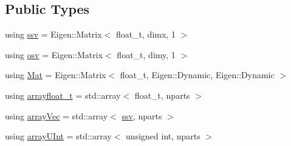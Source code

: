 \subsection*{Public Types}
\begin{DoxyCompactItemize}
\item 
using \hyperlink{classAPF_a5f96da87f00ff75af1232f9021daf06a}{ssv} = Eigen\+::\+Matrix$<$ float\+\_\+t, dimx, 1 $>$
\item 
using \hyperlink{classAPF_aa8ac25c475e54ddf21999f28727a049e}{osv} = Eigen\+::\+Matrix$<$ float\+\_\+t, dimy, 1 $>$
\item 
using \hyperlink{classAPF_a448066ff44c8afb24c89bcea11d604c6}{Mat} = Eigen\+::\+Matrix$<$ float\+\_\+t, Eigen\+::\+Dynamic, Eigen\+::\+Dynamic $>$
\item 
using \hyperlink{classAPF_ac686d94dd5c9f06febed3508dad43520}{arrayfloat\+\_\+t} = std\+::array$<$ float\+\_\+t, nparts $>$
\item 
using \hyperlink{classAPF_af0e0643ea340705993c12b1aa7ad0f4d}{array\+Vec} = std\+::array$<$ \hyperlink{classAPF_a5f96da87f00ff75af1232f9021daf06a}{ssv}, nparts $>$
\item 
using \hyperlink{classAPF_a18fed7b33bf9dbb0e3a78b87d1e75272}{array\+U\+Int} = std\+::array$<$ unsigned int, nparts $>$
\end{DoxyCompactItemize}
